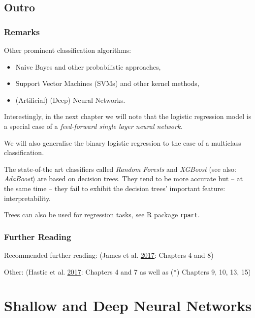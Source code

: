 \documentclass[10pt,b5paper,krantz1]{krantz}
\providecommand{\tightlist}{%
  \setlength{\itemsep}{0pt}\setlength{\parskip}{0pt}}
\begin{document}
\hypertarget{outro-3}{%
\section{Outro}\label{outro-3}}

\hypertarget{remarks-3}{%
\subsection{Remarks}\label{remarks-3}}

Other prominent classification algorithms:

\begin{itemize}
\tightlist
\item
  Naive Bayes and other probabilistic approaches,
\item
  Support Vector Machines (SVMs) and other kernel methods,
\item
  (Artificial) (Deep) Neural Networks.
\end{itemize}

Interestingly, in the next chapter we will note that the logistic regression model
is a special case of a \emph{feed-forward single layer neural network}.

We will also generalise the binary logistic regression to the case of
a multiclass classification.

The state-of-the art classifiers called
\emph{Random Forests} and \emph{XGBoost} (see also: \emph{AdaBoost}) are based on decision trees.
They tend to be more accurate but -- at the same time -- they fail to
exhibit the decision trees' important feature: interpretability.

Trees can also be used for regression tasks, see R package \texttt{rpart}.

\hypertarget{further-reading-3}{%
\subsection{Further Reading}\label{further-reading-3}}

Recommended further reading: (James et al. \protect\hyperlink{ref-islr}{2017}: Chapters 4 and 8)

Other: (Hastie et al. \protect\hyperlink{ref-esl}{2017}: Chapters 4 and 7 as well as (*) Chapters 9, 10, 13, 15)

\hypertarget{shallow-and-deep-neural-networks}{%
\chapter{Shallow and Deep Neural Networks}\label{shallow-and-deep-neural-networks}}
\end{document}

